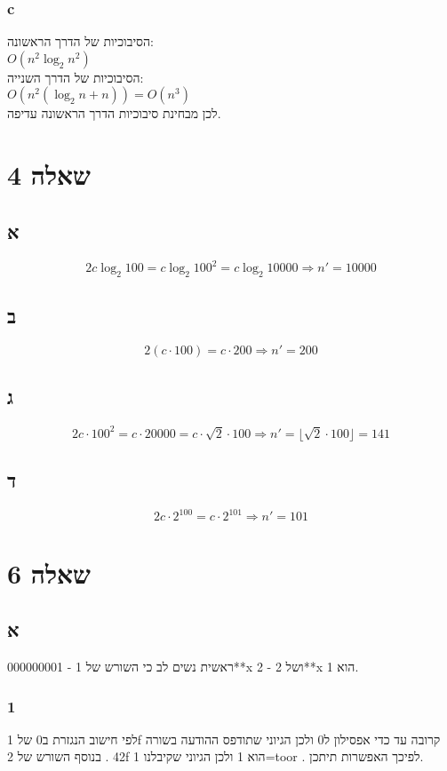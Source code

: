 \documentclass[a4paper]{article}
\begin{document}
\subsubsection*{c}
הסיבוכיות של הדרך הראשונה: \\
$O(n^2 \log_2 n^2)$ \\
הסיבוכיות של הדרך השנייה: \\
$O(n^2 (\log_2 n + n)) = O(n^3)$ \\
לכן מבחינת סיבוכיות הדרך הראשונה עדיפה.
\section*{שאלה 4}
\subsection*{א}
\begin{equation*}
    2c \log_2 100 = c \log_2 100^2 = c \log_2 10000 \Rightarrow n' = 10000
\end{equation*}
\subsection*{ב}
\begin{equation*}
    2(c \cdot 100) = c \cdot 200 \Rightarrow n' = 200
\end{equation*}
\subsection*{ג}
\begin{equation*}
    2c \cdot 100^2 = c \cdot 20000 = c \cdot \sqrt{2} \cdot 100
    \Rightarrow n' = \lfloor \sqrt{2} \cdot 100 \rfloor = 141 
\end{equation*}
\subsection*{ד}
\begin{equation*}
    2c \cdot 2^{100} = c \cdot 2^{101} \Rightarrow n' = 101
\end{equation*}
\section*{שאלה 6}
\subsection*{א}
ראשית נשים לב כי השורש של 
1 - 000000001**x
ושל
2 - 2**x
הוא 1.
\subsubsection*{1}
לפי חישוב הנגזרת ב0 של
1f
קרובה עד כדי אפסילון ל0 ולכן הגיוני שתודפס ההודעה בשורה
42
. בנוסף השורש של
2f
הוא 1 ולכן הגיוני שקיבלנו
1=toor
. לפיכך האפשרות תיתכן.
\end{document}

